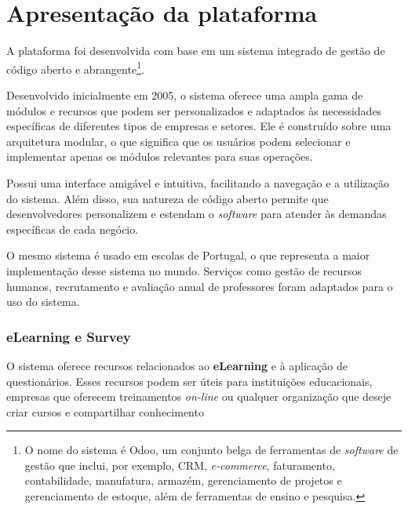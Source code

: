 \captionsetup{justification=raggedright, singlelinecheck=false}

\chapter{Apresentação da plataforma}


A plataforma foi desenvolvida com base em um sistema integrado de gestão 
de código aberto e abrangente\footnote{O nome do sistema é Odoo, um conjunto belga de ferramentas 
de \textit{software} de gestão que inclui, por exemplo, CRM, \textit{e-commerce}, faturamento, 
contabilidade, manufatura, armazém, gerenciamento de projetos e gerenciamento 
de estoque, além de ferramentas de ensino e pesquisa.}.

Desenvolvido inicialmente em 2005, o sistema oferece uma ampla gama de módulos e 
recursos que podem ser personalizados e adaptados às necessidades específicas de 
diferentes tipos de empresas e setores. Ele é construído sobre uma arquitetura 
modular, o que significa que os usuários podem selecionar e implementar apenas 
os módulos relevantes para suas operações.

Possui uma interface amigável e intuitiva, facilitando a navegação e a 
utilização do sistema. Além disso, sua natureza de código aberto permite que 
desenvolvedores personalizem e estendam o \textit{software} para atender às demandas 
específicas de cada negócio.

O mesmo sistema é usado em escolas de Portugal, o que representa a maior implementação 
desse sistema no mundo. Serviços como gestão de recursos humanos, recrutamento e avaliação 
anual de professores foram adaptados para o uso do sistema.

\subsection{eLearning e Survey}

O sistema oferece recursos relacionados ao \textbf{eLearning} e à aplicação de questionários. 
Esses recursos podem ser úteis para instituições educacionais, empresas que oferecem treinamentos 
\textit{on-line} ou qualquer organização que deseje criar cursos e compartilhar conhecimento


